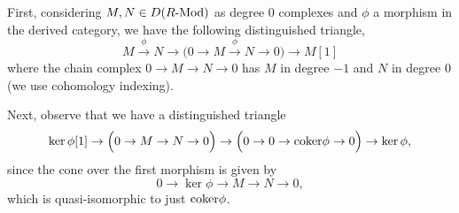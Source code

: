 \documentclass[12pt]{article}
\begin{document}
First, considering $M,N \in D(R\text{-}\mathrm{Mod})$ as degree 0 complexes and $\phi$ a morphism in the derived category, we have the following distinguished triangle,
\[M \xrightarrow{\phi} N \to \Big(0\to M\xrightarrow{\phi} N\to 0\Big) \to M[1]\]
where the chain complex $0\to M\to N\to 0$ has $M$ in degree $-1$ and $N$ in degree $0$ (we use cohomology indexing).

Next, observe that we have a distinguished triangle
\[\ker\phi[1] \to \Big(0 \to M \to N \to 0\Big) \to \Big(0 \to 0 \to \coker\phi \to 0 \Big) \to \ker\phi,\]
since the cone over the first morphism is given by
\[0 \to \ker \phi \to M \to N \to 0,\]
which is quasi-isomorphic to just $\coker\phi$.
\end{document}
